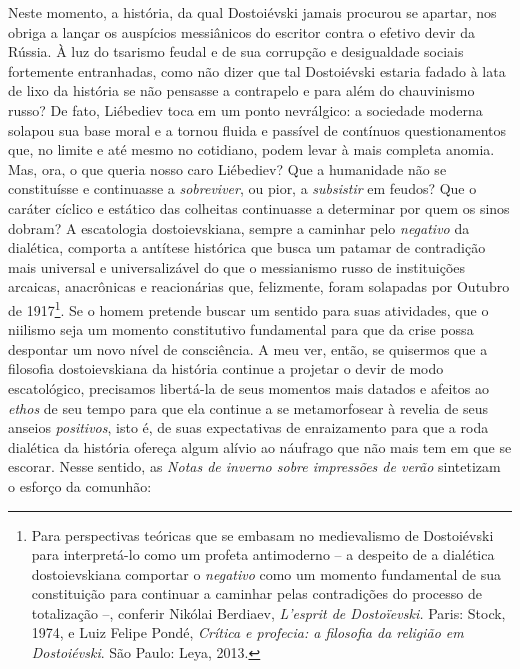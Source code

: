 Neste momento, a história, da qual Dostoiévski jamais procurou se
apartar, nos obriga a lançar os auspícios messiânicos do escritor contra
o efetivo devir da Rússia. À luz do tsarismo feudal e de sua corrupção e
desigualdade sociais fortemente entranhadas, como não dizer que tal
Dostoiévski estaria fadado à lata de lixo da história se não pensasse a
contrapelo e para além do chauvinismo russo? De fato, Liébediev toca em
um ponto nevrálgico: a sociedade moderna solapou sua base moral e a
tornou fluida e passível de contínuos questionamentos que, no limite e
até mesmo no cotidiano, podem levar à mais completa anomia. Mas, ora, o
que queria nosso caro Liébediev? Que a humanidade não se constituísse e
continuasse a \emph{sobreviver}, ou pior, a \emph{subsistir} em feudos?
Que o caráter cíclico e estático das colheitas continuasse a determinar
por quem os sinos dobram? A escatologia dostoievskiana, sempre a
caminhar pelo \emph{negativo} da dialética, comporta a antítese
histórica que busca um patamar de contradição mais universal e
universalizável do que o messianismo russo de instituições arcaicas,
anacrônicas e reacionárias que, felizmente, foram solapadas por Outubro
de 1917\footnote{Para perspectivas teóricas que se embasam no
  medievalismo de Dostoiévski para interpretá-lo como um profeta
  antimoderno -- a despeito de a dialética dostoievskiana comportar o
  \emph{negativo} como um momento fundamental de sua constituição para
  continuar a caminhar pelas contradições do processo de totalização --,
  conferir Nikólai Berdiaev, \emph{L'esprit de Dostoïevski.} Paris:
  Stock, 1974, e Luiz Felipe Pondé, \emph{Crítica e profecia: a
  filosofia da religião em Dostoiévski}. São Paulo: Leya, 2013.}. Se o
homem pretende buscar um sentido para suas atividades, que o niilismo
seja um momento constitutivo fundamental para que da crise possa
despontar um novo nível de consciência. A meu ver, então, se quisermos
que a filosofia dostoievskiana da história continue a projetar o devir
de modo escatológico, precisamos libertá-la de seus momentos mais
datados e afeitos ao \emph{ethos} de seu tempo para que ela continue a
se metamorfosear à revelia de seus anseios \emph{positivos}, isto é, de
suas expectativas de enraizamento para que a roda dialética da história
ofereça algum alívio ao náufrago que não mais tem em que se escorar.
Nesse sentido, as \emph{Notas de inverno sobre impressões de verão}
sintetizam o esforço da comunhão:

